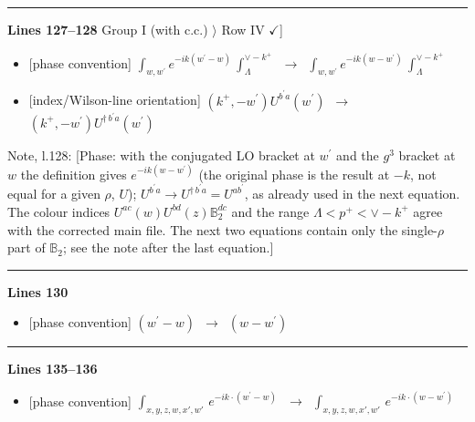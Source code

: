 \documentclass[10pt]{article}
\newenvironment{notebox}{\def\FrameCommand{{\color{notebar}\vrule width 1.5pt}\hspace{6pt}}\MakeFramed{\advance\hsize-\width\FrameRestore}\small}{\endMakeFramed}
\def\mf#1{\mathbb{#1}}
\begin{document}
\noindent\rule{\linewidth}{0.3pt}\par\noindent\textbf{Lines 127--128} \quad \textsf{Group I (with c.c.) $\rangle$ Row IV { $\checkmark$]}} \par
\begin{itemize}[leftmargin=2.2em,itemsep=1pt,topsep=2pt]
\item[\textbf{l.127}] \textsf{\small [phase convention]} $\displaystyle \int_{w, w^\prime} e^{-ik(w^\prime-w)}\, \int_{\Lambda}^{\vee - k^{+}}$\ $\longrightarrow$\ $\displaystyle \int_{w, w^\prime} e^{-ik(w-w^\prime)}\, \int_{\Lambda}^{\vee - k^{+}}$
\item[\textbf{l.127}] \textsf{\small [index/Wilson-line orientation]} $\displaystyle (k^{+},-w^{\prime})U^{b^{\prime}a}(w^{\prime})$\ $\longrightarrow$\ $\displaystyle (k^{+},-w^{\prime})U^{\dagger\, b^{\prime}a}(w^{\prime})$
\end{itemize}
\begin{notebox}\textsf{\small Note, l.128:} [Phase: with the conjugated LO bracket at $w^\prime$ and the $g^3$ bracket at $w$ the definition gives $e^{-ik(w-w^\prime)}$ (the original phase is the result at $-k$, not equal for a given $\rho$, $U$); $U^{b^\prime a}\to U^{\dagger\, b^\prime a}=U^{ab^\prime}$, as already used in the next equation. The colour indices $U^{ac}(w)U^{bd}(z)\mf{B}_2^{dc}$ and the range $\Lambda<p^+<\vee-k^+$ agree with the corrected main file. The next two equations contain only the single-$\rho$ part of $\mf{B}_2$; see the note after the last equation.]\end{notebox}
\noindent\rule{\linewidth}{0.3pt}\par\noindent\textbf{Lines 130} \par
\begin{itemize}[leftmargin=2.2em,itemsep=1pt,topsep=2pt]
\item[\textbf{l.130}] \textsf{\small [phase convention]} $\displaystyle (w^\prime-w)$\ $\longrightarrow$\ $\displaystyle (w-w^\prime)$
\end{itemize}
\noindent\rule{\linewidth}{0.3pt}\par\noindent\textbf{Lines 135--136} \par
\begin{itemize}[leftmargin=2.2em,itemsep=1pt,topsep=2pt]
\item[\textbf{l.135}] \textsf{\small [phase convention]} $\displaystyle \int_{x,y,z,w,x',w'}\,e^{-ik\cdot (w^\prime-w)}\,$\ $\longrightarrow$\ $\displaystyle \int_{x,y,z,w,x',w'}\,e^{-ik\cdot (w-w^\prime)}\,$
\end{itemize}
\end{document}
